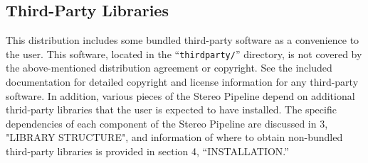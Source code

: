 \subsection{Third-Party Libraries}

This distribution includes some bundled third-party software as a
convenience to the user.  This software, located in the
``\texttt{thirdparty/}'' directory, is not covered by the above-mentioned
distribution agreement or copyright.  See the included documentation
for detailed copyright and license information for any third-party
software.  In addition, various pieces of the Stereo Pipeline depend
on additional thrid-party libraries that the user is expected to
have installed.  The specific dependencies of each component of the
Stereo Pipeline are discussed in 3, "LIBRARY STRUCTURE", and
information of where to obtain non-bundled third-party libraries
is provided in section 4, ``INSTALLATION.''

